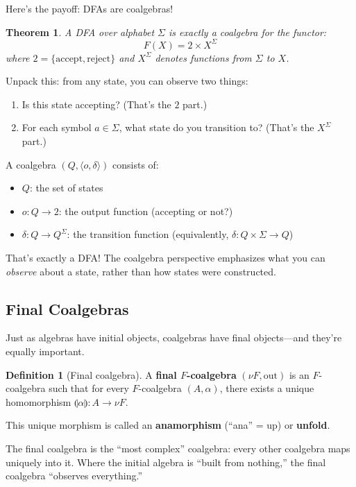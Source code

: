 \documentclass[11pt]{article}
\theoremstyle{definition}
\newtheorem{definition}{Definition}[section]
\theoremstyle{plain}
\newtheorem{theorem}{Theorem}[section]
\theoremstyle{remark}
\begin{document}
Here's the payoff: DFAs are coalgebras!

\begin{theorem}
A DFA over alphabet $\Sigma$ is exactly a coalgebra for the functor:
\[
F(X) = 2 \times X^\Sigma
\]
where $2 = \{\text{accept}, \text{reject}\}$ and $X^\Sigma$ denotes functions from $\Sigma$ to $X$.
\end{theorem}

Unpack this: from any state, you can observe two things:
\begin{enumerate}
  \item Is this state accepting? (That's the $2$ part.)
  \item For each symbol $a \in \Sigma$, what state do you transition to? (That's the $X^\Sigma$ part.)
\end{enumerate}

A coalgebra $(Q, \langle o, \delta \rangle)$ consists of:
\begin{itemize}
  \item $Q$: the set of states
  \item $o: Q \to 2$: the output function (accepting or not?)
  \item $\delta: Q \to Q^\Sigma$: the transition function (equivalently, $\delta: Q \times \Sigma \to Q$)
\end{itemize}

That's exactly a DFA! The coalgebra perspective emphasizes what you can \emph{observe} about a state, rather than how states were constructed.

\subsection{Final Coalgebras}

Just as algebras have initial objects, coalgebras have final objects---and they're equally important.

\begin{definition}[Final coalgebra]
A \textbf{final $F$-coalgebra} $(\nu F, \text{out})$ is an $F$-coalgebra such that for every $F$-coalgebra $(A, \alpha)$, there exists a unique homomorphism $\llparenthesis \alpha \rrparenthesis: A \to \nu F$.

This unique morphism is called an \textbf{anamorphism} (``ana'' = up) or \textbf{unfold}.
\end{definition}

The final coalgebra is the ``most complex'' coalgebra: every other coalgebra maps uniquely into it. Where the initial algebra is ``built from nothing,'' the final coalgebra ``observes everything.''
\end{document}
